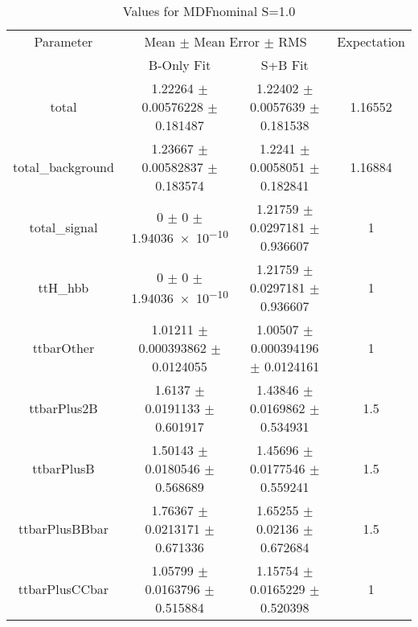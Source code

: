 \begin{table}
\centering
\caption{Values for MDFnominal S=1.0}
\begin{tabular}{cccc}
\toprule
Parameter & \multicolumn{2}{c}{Mean $\pm$ Mean Error $\pm$ RMS} & Expectation\\
 & B-Only Fit & S+B Fit & \\
\midrule
total & \num{1.22264} $\pm$ \num{0.00576228} $\pm$ \num{0.181487} & \num{1.22402} $\pm$ \num{0.0057639} $\pm$ \num{0.181538} & \num{1.16552}\\
total\_background & \num{1.23667} $\pm$ \num{0.00582837} $\pm$ \num{0.183574} & \num{1.2241} $\pm$ \num{0.0058051} $\pm$ \num{0.182841} & \num{1.16884}\\
total\_signal & \num{0} $\pm$ \num{0} $\pm$ \num{1.94036e-10} & \num{1.21759} $\pm$ \num{0.0297181} $\pm$ \num{0.936607} & \num{1}\\
ttH\_hbb & \num{0} $\pm$ \num{0} $\pm$ \num{1.94036e-10} & \num{1.21759} $\pm$ \num{0.0297181} $\pm$ \num{0.936607} & \num{1}\\
ttbarOther & \num{1.01211} $\pm$ \num{0.000393862} $\pm$ \num{0.0124055} & \num{1.00507} $\pm$ \num{0.000394196} $\pm$ \num{0.0124161} & \num{1}\\
ttbarPlus2B & \num{1.6137} $\pm$ \num{0.0191133} $\pm$ \num{0.601917} & \num{1.43846} $\pm$ \num{0.0169862} $\pm$ \num{0.534931} & \num{1.5}\\
ttbarPlusB & \num{1.50143} $\pm$ \num{0.0180546} $\pm$ \num{0.568689} & \num{1.45696} $\pm$ \num{0.0177546} $\pm$ \num{0.559241} & \num{1.5}\\
ttbarPlusBBbar & \num{1.76367} $\pm$ \num{0.0213171} $\pm$ \num{0.671336} & \num{1.65255} $\pm$ \num{0.02136} $\pm$ \num{0.672684} & \num{1.5}\\
ttbarPlusCCbar & \num{1.05799} $\pm$ \num{0.0163796} $\pm$ \num{0.515884} & \num{1.15754} $\pm$ \num{0.0165229} $\pm$ \num{0.520398} & \num{1}\\
\bottomrule
\end{tabular}
\end{table}